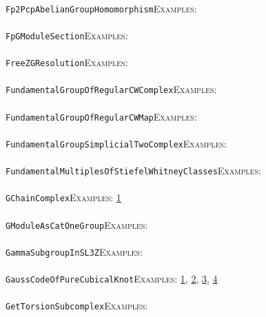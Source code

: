 \documentclass[a4paper,11pt]{report}
\begin{document}
{{ \\
 \texttt{Fp2PcpAbelianGroupHomomorphism}{\nobreakspace}{\nobreakspace}{\nobreakspace}{\nobreakspace}\textsc{Examples:} \\
 \\
 \texttt{FpGModuleSection}{\nobreakspace}{\nobreakspace}{\nobreakspace}{\nobreakspace}\textsc{Examples:} \\
 \\
 \texttt{FreeZGResolution}{\nobreakspace}{\nobreakspace}{\nobreakspace}{\nobreakspace}\textsc{Examples:} \\
 \\
 \texttt{FundamentalGroupOfRegularCWComplex}{\nobreakspace}{\nobreakspace}{\nobreakspace}{\nobreakspace}\textsc{Examples:} \\
 \\
 \texttt{FundamentalGroupOfRegularCWMap}{\nobreakspace}{\nobreakspace}{\nobreakspace}{\nobreakspace}\textsc{Examples:} \\
 \\
 \texttt{FundamentalGroupSimplicialTwoComplex}{\nobreakspace}{\nobreakspace}{\nobreakspace}{\nobreakspace}\textsc{Examples:} \\
 \\
 \texttt{FundamentalMultiplesOfStiefelWhitneyClasses}{\nobreakspace}{\nobreakspace}{\nobreakspace}{\nobreakspace}\textsc{Examples:} \\
 \\
 \texttt{GChainComplex}{\nobreakspace}{\nobreakspace}{\nobreakspace}{\nobreakspace}\textsc{Examples:} \href{../www/SideLinks/About/aboutBredon.html} {1}{\nobreakspace} \\
 \\
 \texttt{GModuleAsCatOneGroup}{\nobreakspace}{\nobreakspace}{\nobreakspace}{\nobreakspace}\textsc{Examples:} \\
 \\
 \texttt{GammaSubgroupInSL3Z}{\nobreakspace}{\nobreakspace}{\nobreakspace}{\nobreakspace}\textsc{Examples:} \\
 \\
 \texttt{GaussCodeOfPureCubicalKnot}{\nobreakspace}{\nobreakspace}{\nobreakspace}{\nobreakspace}\textsc{Examples:} \href{tutorial/chap5.html} {1}{\nobreakspace}, \href{../www/SideLinks/About/aboutQuandles2.html} {2}{\nobreakspace}, \href{../www/SideLinks/About/aboutQuandles.html} {3}{\nobreakspace}, \href{../www/SideLinks/About/aboutKnotsQuandles.html} {4}{\nobreakspace} \\
 \\
 \texttt{GetTorsionSubcomplex}{\nobreakspace}{\nobreakspace}{\nobreakspace}{\nobreakspace}\textsc{Examples:} \\
}}
\end{document}
